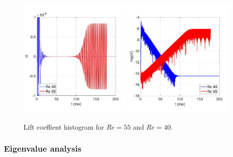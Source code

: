 \documentclass[journal,final]{new-aiaa}
\begin{document}
\begin{figure}[htb]
	\centering   
	\includegraphics[width=0.49\textwidth]{pic/cl-linear.jpg}	\includegraphics[width=0.49\textwidth]{pic/cl-log.jpg}
	\caption{Lift coeffient histogram for $Re=55$ and $Re=40$.}
	\label{fig:cyl-re40-re55-uns}
\end{figure}



\subsubsection{Eigenvalue analysis}
\end{document}
